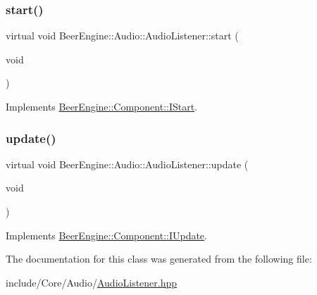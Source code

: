 \subsubsection{\texorpdfstring{start()}{start()}}
{\footnotesize\ttfamily virtual void Beer\+Engine\+::\+Audio\+::\+Audio\+Listener\+::start (\begin{DoxyParamCaption}\item[{void}]{ }\end{DoxyParamCaption})\hspace{0.3cm}{\ttfamily [virtual]}}



Implements \mbox{\hyperlink{class_beer_engine_1_1_component_1_1_i_start_aa3e25e86e20c46cdaefc6f6d7f21e495}{Beer\+Engine\+::\+Component\+::\+I\+Start}}.

\mbox{\label{class_beer_engine_1_1_audio_1_1_audio_listener_a32c348d619ff2ca57d16af803d7dfcfd}} 
\subsubsection{\texorpdfstring{update()}{update()}}
{\footnotesize\ttfamily virtual void Beer\+Engine\+::\+Audio\+::\+Audio\+Listener\+::update (\begin{DoxyParamCaption}\item[{void}]{ }\end{DoxyParamCaption})\hspace{0.3cm}{\ttfamily [virtual]}}



Implements \mbox{\hyperlink{class_beer_engine_1_1_component_1_1_i_update_aeeda0aa303175720e449b4c51d9867dd}{Beer\+Engine\+::\+Component\+::\+I\+Update}}.



The documentation for this class was generated from the following file\+:\begin{DoxyCompactItemize}
\item 
include/\+Core/\+Audio/\mbox{\hyperlink{_audio_listener_8hpp}{Audio\+Listener.\+hpp}}\end{DoxyCompactItemize}

